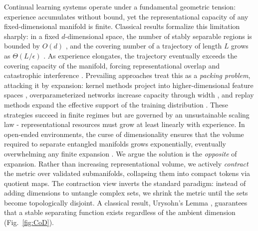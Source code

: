 \documentclass{article}
\begin{document}
Continual learning systems operate under a fundamental geometric tension: experience accumulates without bound, yet the representational capacity of any fixed-dimensional manifold is finite.
Classical results formalize this limitation sharply: in a fixed $d$-dimensional space, the number of stably separable regions is bounded by $O(d)$ \cite{cover1965geometry,vapnik1998statistical}, and the covering number of a trajectory of length $L$ grows as $\Theta(L/\epsilon)$ \cite{kolmogorov1959entropy,shalev2014understanding}.
As experience elongates, the trajectory eventually exceeds the covering capacity of the manifold, forcing representational overlap and catastrophic interference \cite{mccloskey1989catastrophic,french1999catastrophic}.
Prevailing approaches treat this as a \emph{packing problem}, attacking it by expansion: kernel methods project into higher-dimensional feature spaces \cite{shawe2004kernel}, overparameterized networks increase capacity through width \cite{allen2019learning}, and replay methods expand the effective support of the training distribution \cite{parisi2019continual}. These strategies succeed in finite regimes but are governed by an unsustainable scaling law - representational resources must grow at least linearly with experience. In open-ended environments, the curse of dimensionality ensures that the volume required to separate entangled manifolds grows exponentially, eventually overwhelming any finite expansion \cite{bellman1957dynamic}. 
We argue the solution is the \emph{opposite} of expansion. Rather than increasing representational volume, we actively \emph{contract} the metric over validated submanifolds, collapsing them into compact tokens via quotient maps. The contraction view inverts the standard paradigm: instead of adding dimensions to untangle complex sets, we shrink the metric until the sets become topologically disjoint. A classical result, Urysohn's Lemma \cite{willard2012general}, guarantees that a stable separating function exists regardless of the ambient dimension (Fig.~\ref{fig:CoD}). %
 
\end{document}
